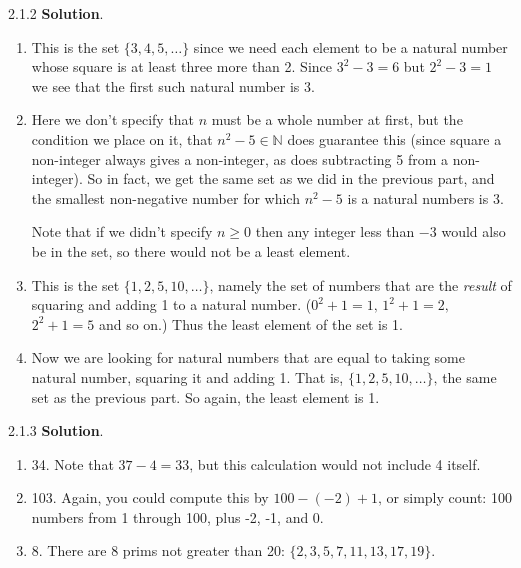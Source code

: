\documentclass[11pt,]{book}
\theoremstyle{ptxplainnotitle}
\theoremstyle{ptxplaintitle}
\theoremstyle{ptxdefinitionnotitle}
\theoremstyle{ptxdefinitiontitle}
\theoremstyle{ptxdefinitionnotitle}
\theoremstyle{ptxdefinitiontitle}
\theoremstyle{ptxdefinitionnotitle}
\theoremstyle{ptxdefinitiontitle}
\theoremstyle{ptxdefinitiontitlenonumber}
\theoremstyle{ptxdefinitiontitlenonumber}
\numberwithin{equation}{chapter}
\newcommand{\N}{\mathbb N}
\begin{document}
\begin{divisionexercise}{2.1.2}
\textbf{Solution}.\quad%
\hypertarget{p-799}{}%
\leavevmode%
\begin{enumerate}[label=\alph*.]
\item\hypertarget{li-358}{}\hypertarget{p-800}{}%
This is the set \(\{3, 4, 5, \ldots \}\) since we need each element to be a natural number whose square is at least three more than 2.  Since \(3^2 - 3 = 6\) but \(2^2 - 3 = 1\) we see that the first such natural number is 3.%
\item\hypertarget{li-359}{}\hypertarget{p-801}{}%
Here we don't specify that \(n\) must be a whole number at first, but the condition we place on it, that \(n^2 - 5 \in \N\) does guarantee this (since square a non-integer always gives a non-integer, as does subtracting 5 from a non-integer).  So in fact, we get the same set as we did in the previous part, and the smallest non-negative number for which \(n^2 - 5\) is a natural numbers is 3.%
\par
\hypertarget{p-802}{}%
Note that if we didn't specify \(n \ge 0\) then any integer less than \(-3\) would also be in the set, so there would not be a least element.%
\item\hypertarget{li-360}{}\hypertarget{p-803}{}%
This is the set \(\{1, 2, 5, 10, \ldots\}\text{,}\) namely the set of numbers that are the \emph{result} of squaring and adding 1 to a natural number.  (\(0^2 + 1 = 1\text{,}\) \(1^2 + 1 = 2\text{,}\) \(2^2 + 1 = 5\) and so on.)  Thus the least element of the set is 1.%
\item\hypertarget{li-361}{}\hypertarget{p-804}{}%
Now we are looking for natural numbers that are equal to taking some natural number, squaring it and adding 1.  That is, \(\{1, 2, 5, 10, \ldots\}\text{,}\) the same set as the previous part.  So again, the least element is 1.%
\end{enumerate}
%
\end{divisionexercise}%
\begin{divisionexercise}{2.1.3}
\textbf{Solution}.\quad%
\hypertarget{p-817}{}%
\leavevmode%
\begin{enumerate}[label=\alph*.]
\item\hypertarget{li-371}{}\hypertarget{p-818}{}%
34. Note that \(37-4 = 33\text{,}\) but this calculation would not include 4 itself.%
\item\hypertarget{li-372}{}\hypertarget{p-819}{}%
103. Again, you could compute this by \(100-(-2)+1\text{,}\) or simply count: 100 numbers from 1 through 100, plus -2, -1, and 0.%
\item\hypertarget{li-373}{}\hypertarget{p-820}{}%
8. There are 8 prims not greater than 20: \(\{2, 3, 5, 7, 11, 13, 17, 19\}\text{.}\)%
\end{enumerate}
%
\end{divisionexercise}%
\end{document}
